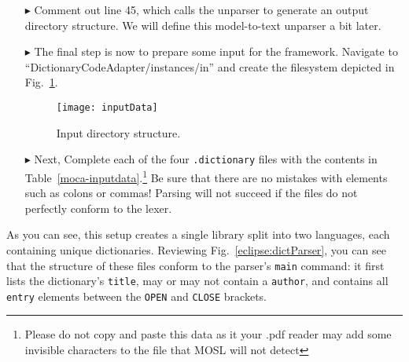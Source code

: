 \begin{itemize}

\item[$\blacktriangleright$] Comment out line 45, which calls the unparser to generate an output directory structure. We will define this model-to-text unparser
a bit later. 

\newpage

\item[$\blacktriangleright$] The final step is now to prepare some input for the framework. Navigate to ``DictionaryCodeAdapter/instances/in'' and create the
filesystem depicted in Fig.~\ref{eclipse:textDirectory}. 

\vspace{1cm}

\begin{figure}[htp]
\begin{center}
  \texttt{[image: inputData]}
  \caption{Input directory structure.}
  \label{eclipse:textDirectory}
\end{center}
\end{figure}

\vspace{1cm}

\item[$\blacktriangleright$] Next, Complete each of the four \texttt{.dictionary} files with the contents in Table~\ref{moca-inputdata}.\footnote{Please do not
copy and paste this data as it your .pdf reader may add some invisible characters to the file that MOSL will not detect} Be sure that there are no mistakes with
elements such as colons or commas! Parsing will not succeed if the files do not perfectly conform to the lexer. 

\end{itemize}

As you can see, this setup creates a single library split into two languages, each containing unique dictionaries. Reviewing
Fig.~\ref{eclipse:dictParser}, you can see that the structure of these files conform to the parser's \texttt{main} command: it first lists the dictionary's
\texttt{title}, may or may not contain a \texttt{author}, and contains all \texttt{entry} elements between the \texttt{OPEN} and \texttt{CLOSE} brackets.


